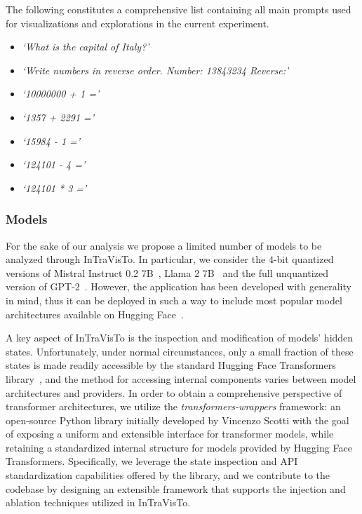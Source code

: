 The following constitutes a comprehensive list containing all main prompts used for visualizations and explorations in the current experiment.

\begin{multicols}{2}
    \begin{itemize}
        \item \emph{`What is the capital of Italy?'}
        \item \emph{`Write numbers in reverse order. Number: 13843234 Reverse:'}
        \item \emph{`10000000 + 1 ='}
        \item \emph{`1357 + 2291 ='}
        \item \emph{`15984 - 1 ='}
        \item \emph{`124101 - 4 ='}
        \item \emph{`124101 * 3 ='}
    \end{itemize}
\end{multicols}

\subsubsection{Models}

For the sake of our analysis we propose a limited number of models to be analyzed through InTraVisTo.
In particular, we consider the $4$-bit quantized versions of Mistral Instruct 0.2 7B~\cite{jiang2023}, Llama 2 7B~\cite{touvron2023} and the full unquantized version of GPT-2~\cite{radford2019}.
However, the application has been developed with generality in mind, thus it can be deployed in such a way to include most popular model architectures available on Hugging Face~\cite{wolf2020}.

A key aspect of InTraVisTo is the inspection and modification of models' hidden states.
Unfortunately, under normal circumstances, only a small fraction of these states is made readily accessible by the standard Hugging Face Transformers library~\cite{wolf2020}, and the method for accessing internal components varies between model architectures and providers.
In order to obtain a comprehensive perspective of transformer architectures, we utilize the \emph{transformers-wrappers} framework\footnotemark: an open-source Python library initially developed by Vincenzo Scotti with the goal of exposing a uniform and extensible interface for transformer models, while retaining a standardized internal structure for models provided by Hugging Face Transformers.
Specifically, we leverage the state inspection and API standardization capabilities offered by the library, and we contribute to the codebase by designing an extensible framework that supports the injection and ablation techniques utilized in InTraVisTo.

